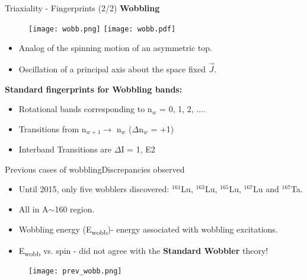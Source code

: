 \documentclass [11pt]{beamer}
\begin{document}
\begin{frame}{Triaxiality - Fingerprints (2/2)}
\vspace{-6pt}
\textbf{\large \color{red} Wobbling}
\vspace{-6pt}
\begin{center}
\begin{figure}
\texttt{[image: wobb.png]}
\hspace{15pt}
\texttt{[image: wobb.pdf]}
\end{figure}
\end{center}
\vspace{-7pt}
\begin{itemize}
\item {Analog of the spinning motion of an asymmetric top.}
\item {Oscillation of a principal axis about the space fixed \textbf{$\vec{J}$}.}
\end{itemize}
\vspace{-4pt}
\textbf{Standard fingerprints for Wobbling bands:}
\begin{itemize}
\item{Rotational bands corresponding to n$_{w}$ = 0, 1, 2, ....}
\item{Transitions from n$_{w+1} \rightarrow$ n$_{w}$ ($\Delta$n$_{w}$ = +1)}
\item{Interband Transitions are $\Delta\mathrm{I}$ = 1, E2} 
\end{itemize}
\end{frame}


\begin{frame}{Previous cases of wobbling}{Discrepancies observed}
\begin{multicols}{2}
\begin{itemize}
\item{Until 2015, only five wobblers discovered:  $^{161}$Lu, $^{163}$Lu, $^{165}$Lu, $^{167}$Lu and $^{167}$Ta.}
\item{All in A$\sim$160 region.}
\item{Wobbling energy (E\textsubscript{wobb})- energy associated with wobbling excitations.}
\item{E\textsubscript{wobb} vs. spin - did not agree with the \textbf{Standard Wobbler} theory!}
\end{itemize}
\begin{figure}
\texttt{[image: prev\_wobb.png]}
\end{figure}
\end{multicols}
\end{frame}
\end{document}

